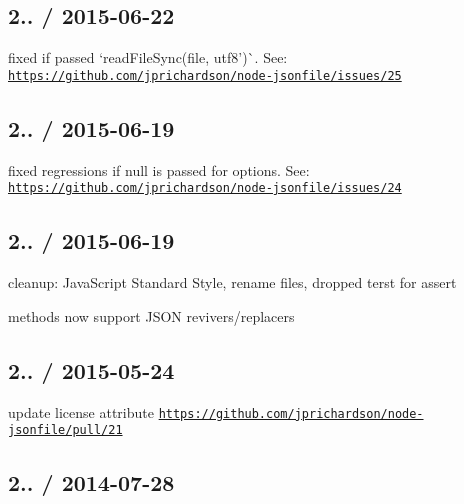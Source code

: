 \subsection*{2.. / 2015-\/06-\/22 }


\begin{DoxyItemize}
\item fixed if passed `read\+File\+Sync(file, \textquotesingle{}utf8')\`{}. See\+: \href{https://github.com/jprichardson/node-jsonfile/issues/25}{\tt https\+://github.\+com/jprichardson/node-\/jsonfile/issues/25}
\end{DoxyItemize}

\subsection*{2.. / 2015-\/06-\/19 }


\begin{DoxyItemize}
\item fixed regressions if {\ttfamily null} is passed for options. See\+: \href{https://github.com/jprichardson/node-jsonfile/issues/24}{\tt https\+://github.\+com/jprichardson/node-\/jsonfile/issues/24}
\end{DoxyItemize}

\subsection*{2.. / 2015-\/06-\/19 }


\begin{DoxyItemize}
\item cleanup\+: Java\+Script Standard Style, rename files, dropped terst for assert
\item methods now support J\+S\+ON revivers/replacers
\end{DoxyItemize}

\subsection*{2.. / 2015-\/05-\/24 }


\begin{DoxyItemize}
\item update license attribute \href{https://github.com/jprichardson/node-jsonfile/pull/21}{\tt https\+://github.\+com/jprichardson/node-\/jsonfile/pull/21}
\end{DoxyItemize}

\subsection*{2.. / 2014-\/07-\/28 }



